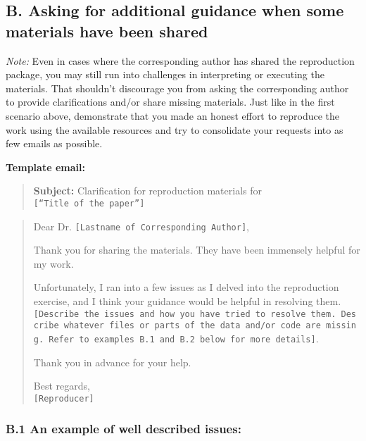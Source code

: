 \documentclass[]{book}
\begin{document}
\hypertarget{b.-asking-for-additional-guidance-when-some-materials-have-been-shared}{%
\subsection{B. Asking for additional guidance when some materials have been shared}\label{b.-asking-for-additional-guidance-when-some-materials-have-been-shared}}

\emph{Note:} Even in cases where the corresponding author has shared the reproduction package, you may still run into challenges in interpreting or executing the materials. That shouldn't discourage you from asking the corresponding author to provide clarifications and/or share missing materials. Just like in the first scenario above, demonstrate that you made an honest effort to reproduce the work using the available resources and try to consolidate your requests into as few emails as possible.

\textbf{Template email:}

\begin{quote}
\textbf{Subject:} Clarification for reproduction materials for \texttt{{[}“Title\ of\ the\ paper”{]}}
\end{quote}

\begin{quote}
Dear Dr. \texttt{{[}Lastname\ of\ Corresponding\ Author{]}},

Thank you for sharing the materials. They have been immensely helpful for my work.

Unfortunately, I ran into a few issues as I delved into the reproduction exercise, and I think your guidance would be helpful in resolving them. \texttt{{[}Describe\ the\ issues\ and\ how\ you\ have\ tried\ to\ resolve\ them.\ Describe\ whatever\ files\ or\ parts\ of\ the\ data\ and/or\ code\ are\ missing.\ Refer\ to\ examples\ B.1\ and\ B.2\ below\ for\ more\ details{]}}.

Thank you in advance for your help.

Best regards,\\
\texttt{{[}Reproducer{]}}
\end{quote}

\hypertarget{b.1-an-example-of-well-described-issues}{%
\subsubsection{B.1 An example of well described issues:}\label{b.1-an-example-of-well-described-issues}}
\end{document}
